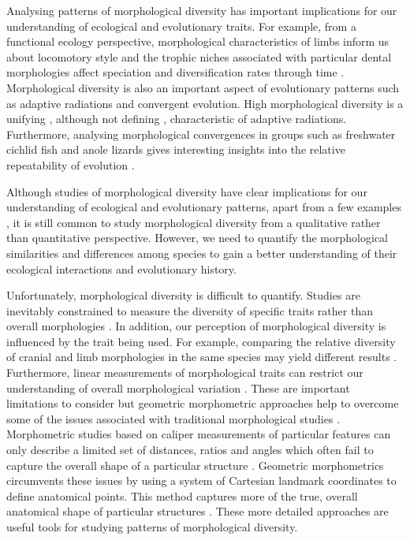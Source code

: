 	Analysing patterns of morphological diversity has important implications for our understanding of ecological and evolutionary traits. For example, from a functional ecology perspective, morphological characteristics of limbs inform us about locomotory style \citep[e.g.][]{Bou1987} and the trophic niches associated with particular dental morphologies affect speciation and diversification rates through time \citep{Price2012}. Morphological diversity is also an important aspect of evolutionary patterns such as adaptive radiations and convergent evolution. High morphological diversity is a unifying \citep{Losos2010a, Olson2009}, although not defining \citep{Glor2010, Olson2009}, characteristic of adaptive radiations. Furthermore, analysing morphological convergences in groups such as freshwater cichlid fish \citep{Muschick2012} and anole lizards \citep{Mahler2013} gives interesting insights into the relative repeatability of evolution \citep{Losos2011}.

	Although studies of morphological diversity have clear implications for our understanding of ecological and evolutionary patterns, apart from a few examples \citep[e.g.][]{Ruta2013, Goswami2011, Brusatte2008}, it is still common to study morphological diversity from a qualitative rather than quantitative perspective. However, we need to quantify the morphological similarities and differences among species to gain a better understanding of their ecological interactions and evolutionary history.


	Unfortunately, morphological diversity is difficult to quantify. Studies are inevitably constrained to measure the diversity of specific traits rather than overall morphologies \citep{Roy1997}. In addition, our perception of morphological diversity is influenced by the trait being used. For example, comparing the relative diversity of cranial and limb morphologies in the same species may yield different results \citep{Foth2012}. Furthermore, linear measurements of morphological traits can restrict our understanding of overall morphological variation \citep{Rohlf1993}. These are important limitations to consider but geometric morphometric approaches help to overcome some of the issues associated with traditional morphological studies \citep{Adams2004}. Morphometric studies based on caliper measurements of particular features can only describe a limited set of distances, ratios and angles which often fail to capture the overall shape of a particular structure \citep{Slice2007}. Geometric morphometrics circumvents these issues by using a system of Cartesian landmark coordinates to define anatomical points. This method captures more of the true, overall anatomical shape of particular structures \citep{Mitteroecker2009}. These more detailed approaches are useful tools for studying patterns of morphological diversity.
	
